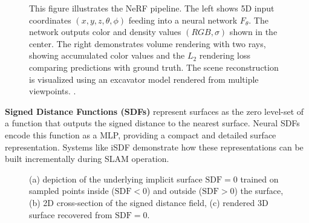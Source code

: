 \documentclass[12pt]{article}
\begin{document}
    \begin{figure}[h!]
        \centering
        \caption{This figure illustrates the NeRF pipeline. The left shows 5D input coordinates $(x,y,z,\theta,\phi)$ feeding into a neural network $F_\theta$. 
        The network outputs color and density values $(RGB,\sigma)$ shown in the center. The right demonstrates volume rendering with two rays, showing accumulated color values and 
        the $L_2$ rendering loss comparing predictions with ground truth. The scene reconstruction is visualized using an excavator model rendered from multiple viewpoints.
        . \cite{nerf_img}}
        \label{fig:nerf}
    \end{figure}


    \textbf{Signed Distance Functions (SDFs)} represent surfaces as the zero level-set of a function that outputs the signed distance to the nearest surface. Neural SDFs encode this function as a MLP, providing a compact and 
    detailed surface representation. Systems like iSDF \cite{isdf} demonstrate how these representations can be built incrementally during SLAM operation.
    
    \begin{figure}[h!]
        \centering
        \caption{(a) depiction of the underlying implicit surface $\text{SDF} = 0$ trained on sampled points inside ($\text{SDF} < 0$) and outside ($\text{SDF} > 0$) the surface, 
        (b) 2D cross-section of the signed distance field, (c) rendered 3D surface recovered from $\text{SDF} = 0$. \cite{deepsdf}}
        \label{fig:nerf}
    \end{figure}
\end{document}
